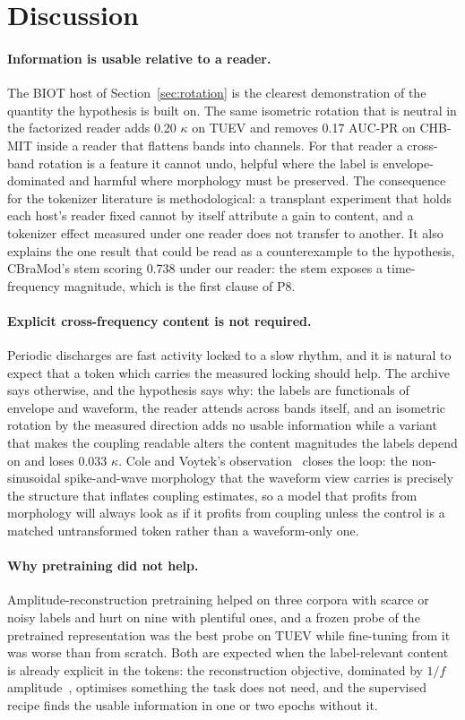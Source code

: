 \section{Discussion}
\label{sec:discussion}

\paragraph{Information is usable relative to a reader.}
The BIOT host of Section~\ref{sec:rotation} is the clearest demonstration of the quantity the hypothesis is built on. The same isometric rotation that is neutral in the factorized reader adds 0.20 $\kappa$ on TUEV and removes 0.17 AUC-PR on CHB-MIT inside a reader that flattens bands into channels. For that reader a cross-band rotation is a feature it cannot undo, helpful where the label is envelope-dominated and harmful where morphology must be preserved. The consequence for the tokenizer literature is methodological: a transplant experiment that holds each host's reader fixed cannot by itself attribute a gain to content, and a tokenizer effect measured under one reader does not transfer to another. It also explains the one result that could be read as a counterexample to the hypothesis, CBraMod's stem scoring 0.738 under our reader: the stem exposes a time-frequency magnitude, which is the first clause of P8.

\paragraph{Explicit cross-frequency content is not required.}
Periodic discharges are fast activity locked to a slow rhythm, and it is natural to expect that a token which carries the measured locking should help. The archive says otherwise, and the hypothesis says why: the labels are functionals of envelope and waveform, the reader attends across bands itself, and an isometric rotation by the measured direction adds no usable information while a variant that makes the coupling readable alters the content magnitudes the labels depend on and loses 0.033 $\kappa$. Cole and Voytek's observation~\cite{cole2017brain} closes the loop: the non-sinusoidal spike-and-wave morphology that the waveform view carries is precisely the structure that inflates coupling estimates, so a model that profits from morphology will always look as if it profits from coupling unless the control is a matched untransformed token rather than a waveform-only one.

\paragraph{Why pretraining did not help.}
Amplitude-reconstruction pretraining helped on three corpora with scarce or noisy labels and hurt on nine with plentiful ones, and a frozen probe of the pretrained representation was the best probe on TUEV while fine-tuning from it was worse than from scratch. Both are expected when the label-relevant content is already explicit in the tokens: the reconstruction objective, dominated by $1/f$ amplitude~\cite{kommineni2026aperiodic,yu2026fame}, optimises something the task does not need, and the supervised recipe finds the usable information in one or two epochs without it.


